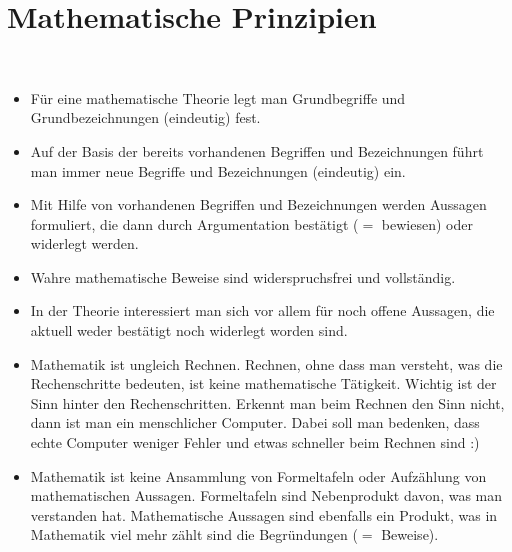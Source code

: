 \section{Mathematische Prinzipien} 

\begin{bem}\ 
\begin{itemize}
		\item Für eine mathematische Theorie legt man Grundbegriffe und Grundbezeichnungen (eindeutig) fest. 
		\item Auf der Basis der bereits vorhandenen Begriffen und Bezeichnungen führt man immer neue Begriffe und Bezeichnungen (eindeutig) ein. 
		\item Mit Hilfe von vorhandenen Begriffen und Bezeichnungen werden Aussagen formuliert, die dann durch Argumentation bestätigt ($=$ bewiesen) oder widerlegt werden. 
		\item Wahre mathematische Beweise sind widerspruchsfrei und vollständig. 
		\item In der Theorie interessiert man sich vor allem für noch offene Aussagen, die aktuell weder bestätigt noch widerlegt worden sind. 
		\item Mathematik ist ungleich Rechnen. Rechnen, ohne dass man versteht, was die Rechenschritte bedeuten, ist keine mathematische Tätigkeit. Wichtig ist der Sinn hinter den Rechenschritten. Erkennt man beim Rechnen den Sinn nicht, dann ist man ein menschlicher Computer. Dabei soll man bedenken, dass echte Computer  weniger Fehler und  etwas schneller beim Rechnen sind :) 
		\item Mathematik ist keine Ansammlung von Formeltafeln oder Aufzählung von mathematischen Aussagen. Formeltafeln sind Nebenprodukt davon, was man verstanden hat. Mathematische Aussagen sind ebenfalls ein Produkt, was in Mathematik viel mehr zählt sind die Begründungen ($=$ Beweise). 
\end{itemize} 
\end{bem} 


 
 
 

\appendix 

